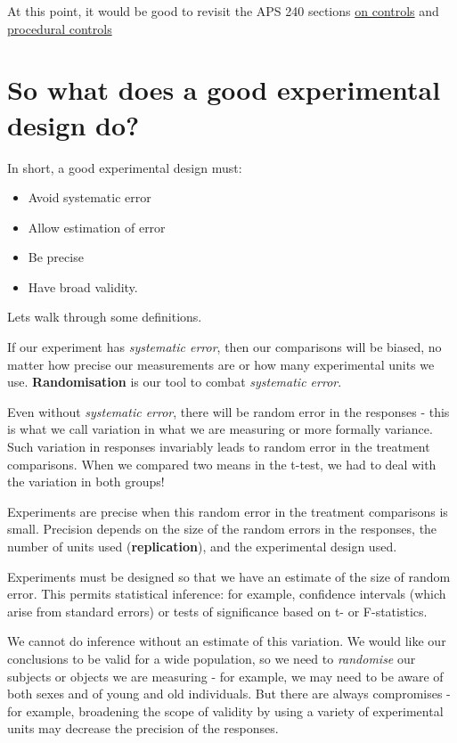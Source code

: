 \documentclass[
]{book}
\providecommand{\tightlist}{%
  \setlength{\itemsep}{0pt}\setlength{\parskip}{0pt}}
\begin{document}
At this point, it would be good to revisit the APS 240 sections \href{https://dzchilds.github.io/stats-for-bio/principles-experimental-design.html\#experimental-control}{on controls} and \href{https://dzchilds.github.io/stats-for-bio/principles-experimental-design.html\#EXPT-DESIGN-PROCEDURAL-CONTROLS}{procedural controls}

\hypertarget{so-what-does-a-good-experimental-design-do}{%
\section{So what does a good experimental design do?}\label{so-what-does-a-good-experimental-design-do}}

In short, a good experimental design must:

\begin{itemize}
\tightlist
\item
  Avoid systematic error
\item
  Allow estimation of error
\item
  Be precise
\item
  Have broad validity.
\end{itemize}

Lets walk through some definitions.

If our experiment has \emph{systematic error}, then our comparisons will be biased, no matter how precise our measurements are or how many experimental units we use. \textbf{Randomisation} is our tool to combat \emph{systematic error}.

Even without \emph{systematic error}, there will be random error in the responses - this is what we call variation in what we are measuring or more formally variance. Such variation in responses invariably leads to random error in the treatment comparisons. When we compared two means in the t-test, we had to deal with the variation in both groups!

Experiments are precise when this random error in the treatment comparisons is small. Precision depends on the size of the random errors in the responses, the number of units used (\textbf{replication}), and the experimental design used.

Experiments must be designed so that we have an estimate of the size of random error. This permits statistical inference: for example, confidence intervals (which arise from standard errors) or tests of significance based on t- or F-statistics.

We cannot do inference without an estimate of this variation. We would like our conclusions to be valid for a wide population, so we need to \emph{randomise} our subjects or objects we are measuring - for example, we may need to be aware of both sexes and of young and old individuals. But there are always compromises - for example, broadening the scope of validity by using a variety of experimental units may decrease the precision of the responses.
\end{document}
